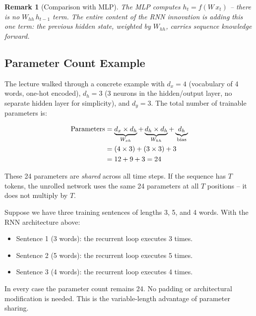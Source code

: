 \documentclass[12pt,a4paper]{article}
\newtheorem{remark}{Remark}[section]
\newcommand{\Whh}{W_{hh}}
\newcommand{\Wxh}{W_{xh}}
\newcommand{\htmo}{h_{t-1}}
\begin{document}
\begin{remark}[Comparison with MLP]
\label{rem:mlp_compare}
The MLP computes $h_t = f(W\, x_t)$ -- there is no $\Whh\, \htmo$ term.
The entire content of the RNN innovation is adding this \emph{one term}: the
previous hidden state, weighted by $\Whh$, carries sequence knowledge forward.
\end{remark}

\subsection{Parameter Count Example}
\label{subsec:param_count}

The lecture walked through a concrete example with $d_x = 4$ (vocabulary of 4
words, one-hot encoded), $d_h = 3$ (3 neurons in the hidden/output layer, no
separate hidden layer for simplicity), and $d_y = 3$.  The total number of
trainable parameters is:

\begin{align}
  \text{Parameters} &= \underbrace{d_x \times d_h}_{\Wxh}
                     + \underbrace{d_h \times d_h}_{\Whh}
                     + \underbrace{d_h}_{\text{bias}} \notag \\
                    &= (4 \times 3) + (3 \times 3) + 3 \notag \\
                    &= 12 + 9 + 3 = 24
  \label{eq:param_count}
\end{align}

These 24 parameters are \emph{shared} across all time steps.  If the sequence
has $T$ tokens, the unrolled network uses the same 24 parameters at all $T$
positions -- it does not multiply by $T$.

\begin{example}[title=Variable-Length Handling]
Suppose we have three training sentences of lengths 3, 5, and 4 words.  With
the RNN architecture above:
\begin{itemize}[noitemsep]
  \item Sentence 1 (3 words): the recurrent loop executes 3 times.
  \item Sentence 2 (5 words): the recurrent loop executes 5 times.
  \item Sentence 3 (4 words): the recurrent loop executes 4 times.
\end{itemize}
In every case the parameter count remains 24.  No padding or architectural
modification is needed.  This is the variable-length advantage of parameter
sharing.
\end{example}
\end{document}
